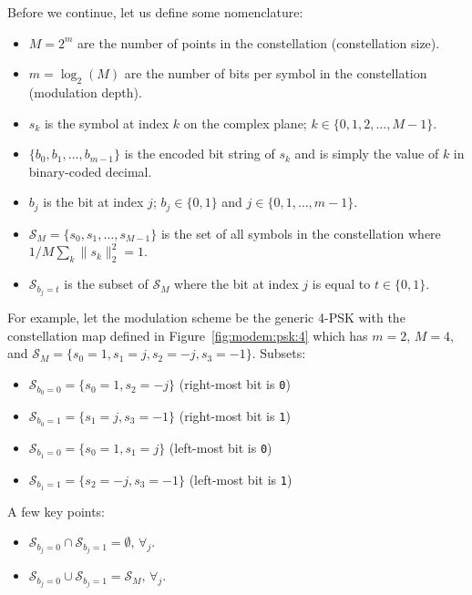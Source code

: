 Before we continue, let us define some nomenclature:
%
\begin{itemize}
\item $M=2^m$ are the number of points in the constellation
      (constellation size).
\item $m=\log_2(M)$ are the number of bits per symbol in the
      constellation (modulation depth).
\item $s_k$ is the symbol at index $k$ on the complex plane;
      $k \in \{0,1,2,\ldots,M-1\}$.
\item $\{b_0,b_1,\ldots,b_{m-1}\}$ is the encoded bit string of $s_k$
      and is simply the value of $k$ in binary-coded decimal.
\item $b_j$ is the bit at index $j$;
      $b_j \in \{0,1\}$ and $j \in \{0,1,\ldots,m-1\}$.
\item $\mathcal{S}_M = \{s_0,s_1,\ldots,s_{M-1}\}$ is the set of all
      symbols in the constellation where
      $1/M \sum_k \|s_k\|_2^2 = 1$.
\item $\mathcal{S}_{b_j=t}$ is the subset of $\mathcal{S}_M$
      where the bit at index $j$ is equal to $t \in \{0,1\}$.
\end{itemize}
%
For example, let the modulation scheme be
the generic 4-PSK with the constellation map defined in Figure~\ref{fig:modem:psk:4}
which has $m=2$, $M=4$, and
$\mathcal{S}_M = \{s_0=1, s_1=j, s_2=-j, s_3=-1\}$.
Subsets:
\begin{itemize}
\item $\mathcal{S}_{b_0=0} = \{s_0= 1, s_2=-j\}$ (right-most bit is {\tt 0})
\item $\mathcal{S}_{b_0=1} = \{s_1= j, s_3=-1\}$ (right-most bit is {\tt 1})
\item $\mathcal{S}_{b_1=0} = \{s_0= 1, s_1= j\}$ (left-most bit is {\tt 0})
\item $\mathcal{S}_{b_1=1} = \{s_2=-j, s_3=-1\}$ (left-most bit is {\tt 1})
\end{itemize}
%
A few key points:
\begin{itemize}
\item $\mathcal{S}_{b_j=0} \cap \mathcal{S}_{b_j=1} = \emptyset,     \, \forall_j$.
\item $\mathcal{S}_{b_j=0} \cup \mathcal{S}_{b_j=1} = \mathcal{S}_M, \, \forall_j$.
\end{itemize}
%

